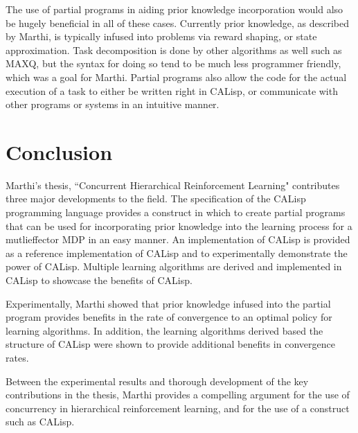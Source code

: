 \documentclass[jair,twoside,11pt,theapa]{article}
\begin{document}
The use of partial programs in aiding prior knowledge incorporation would also be hugely beneficial in all of these cases. Currently prior knowledge, as described by Marthi, is typically infused into problems via reward shaping, or state approximation. Task decomposition is done by other algorithms as well such as MAXQ, but the syntax for doing so tend to be much less programmer friendly, which was a goal for Marthi. Partial programs also allow the code for the actual execution of a task to either be written right in CALisp, or communicate with other programs or systems in an intuitive manner. 

\section{Conclusion}
\label{conclusion}
Marthi's thesis, ``Concurrent Hierarchical Reinforcement Learning" contributes three major developments to the field. The specification of the CALisp programming language provides a construct in which to create partial programs that can be used for incorporating prior knowledge into the learning process for a mutlieffector MDP in an easy manner. An implementation of CALisp is provided as a reference implementation of CALisp and to experimentally demonstrate the power of CALisp. Multiple learning algorithms are derived and implemented in CALisp to showcase the benefits of CALisp. 

Experimentally, Marthi showed that prior knowledge infused into the partial program provides benefits in the rate of convergence to an optimal policy for learning algorithms. In addition, the learning algorithms derived based the structure of CALisp were shown to provide additional benefits in convergence rates. 

Between the experimental results and thorough development of the key contributions in the thesis, Marthi provides a compelling argument for the use of concurrency in hierarchical reinforcement learning, and for the use of a construct such as CALisp. 


\vskip 0.2in


\end{document}
